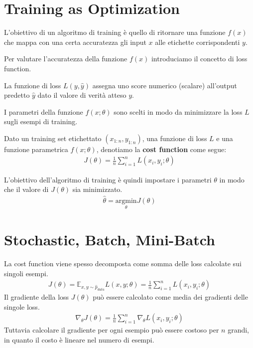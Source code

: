 \section{Training as Optimization}
L'obiettivo di un algoritmo di training è quello di ritornare una funzione $f(x)$ che mappa con una certa accuratezza gli input $x$
alle etichette corrispondenti $y$.

Per valutare l'accuratezza della funzione $f(x)$ introduciamo il concetto di loss function.

La funzione di loss $L(y, \hat{y})$ assegna uno score numerico (scalare) all'output predetto $\hat{y}$ dato il valore di verità atteso $y$.

I parametri della funzione $f(x; \theta)$ sono scelti in modo da minimizzare la loss $L$ sugli esempi di training.

Dato un training set etichettato $(x_{1:n}, y_{1:n})$, una funzione di loss $L$ e una funzione parametrica $f(x; \theta)$, denotiamo la \textbf{cost function} come segue:
\begin{align*}
  J(\theta) = \frac{1}{n} \sum_{i=1}^n L(x_i, y_i; \theta)
\end{align*}

L'obiettivo dell'algoritmo di training è quindi impostare i parametri $\theta$ in modo che il valore di $J(\theta)$ sia minimizzato.
\begin{align*}
  \hat{\theta} = \underset{\theta}{\mathrm{argmin}}{J(\theta)}
\end{align*}

\newpage

\section{Stochastic, Batch, Mini-Batch}
La cost function viene spesso decomposta come somma delle loss calcolate sui singoli esempi.
\begin{align*}
  J(\theta) = \mathbb{E}_{x,y\sim\hat{p}_{data}} L(x, y; \theta) = \frac{1}{n} \sum_{i=1}^n L(x_i, y_i; \theta)
\end{align*}
%
Il gradiente della loss $J(\theta)$ può essere calcolato come media dei gradienti delle singole loss.
\begin{align*}
  \nabla_\theta J(\theta) = \frac{1}{n} \sum_{i=1}^n \nabla_\theta L(x_i, y_i; \theta)
\end{align*}
%
Tuttavia calcolare il gradiente per ogni esempio può essere costoso per $n$ grandi, in quanto il costo è lineare nel numero di esempi.

